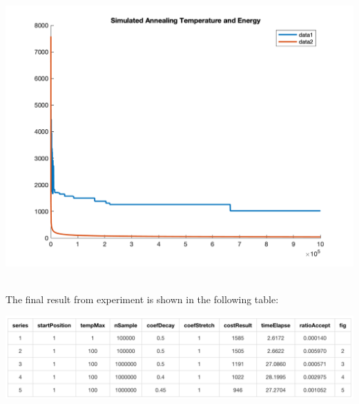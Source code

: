 \begin{center}
    \includegraphics[scale=0.5]{Figures/figure7_1.png}\\
\end{center}\\

The final result from experiment is shown in the following table:

\begin{center}
    \includegraphics[scale=0.5]{Figures/figure7_2.png}\\
\end{center}\\